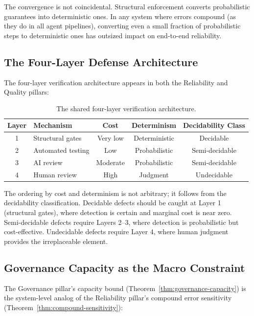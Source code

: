 The convergence is not coincidental. Structural enforcement converts probabilistic guarantees into deterministic ones. In any system where errors compound (as they do in all agent pipelines), converting even a small fraction of probabilistic steps to deterministic ones has outsized impact on end-to-end reliability.

\subsection{The Four-Layer Defense Architecture}

The four-layer verification architecture appears in both the Reliability and Quality pillars:

\begin{table}[h]
\centering
\caption{The shared four-layer verification architecture.}
\label{tab:four-layer}
\begin{tabular}{clccc}
\toprule
\textbf{Layer} & \textbf{Mechanism} & \textbf{Cost} & \textbf{Determinism} & \textbf{Decidability Class} \\
\midrule
1 & Structural gates & Very low & Deterministic & Decidable \\
2 & Automated testing & Low & Probabilistic & Semi-decidable \\
3 & AI review & Moderate & Probabilistic & Semi-decidable \\
4 & Human review & High & Judgment & Undecidable \\
\bottomrule
\end{tabular}
\end{table}

The ordering by cost and determinism is not arbitrary; it follows from the decidability classification. Decidable defects should be caught at Layer 1 (structural gates), where detection is certain and marginal cost is near zero. Semi-decidable defects require Layers 2--3, where detection is probabilistic but cost-effective. Undecidable defects require Layer 4, where human judgment provides the irreplaceable element.

\subsection{Governance Capacity as the Macro Constraint}

The Governance pillar's capacity bound (Theorem~\ref{thm:governance-capacity}) is the system-level analog of the Reliability pillar's compound error sensitivity (Theorem~\ref{thm:compound-sensitivity}):

